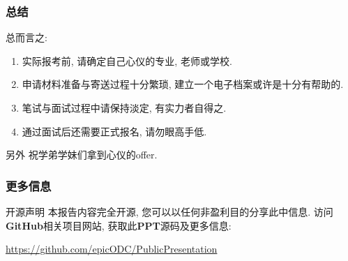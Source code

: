 \documentclass[Blue,dvipsnames]{beamer}
\begin{document}
    \begin{frame}
      \frametitle{总结}
      总而言之:
        \begin{enumerate}[label=--]
          \item 实际报考前, 请确定自己心仪的专业, 老师或学校.
          \item 申请材料准备与寄送过程十分繁琐, 建立一个电子档案或许是十分有帮助的.
          \item 笔试与面试过程中请保持淡定, 有实力者自得之.
          \item 通过面试后还需要正式报名, 请勿眼高手低.
        \end{enumerate}
        {
          \begin{block}{\small{另外}}
            祝学弟学妹们拿到心仪的offer.
          \end{block}
          }

      \end{frame}

    \begin{frame}
      \frametitle{更多信息}
      \begin{block}{开源声明}
        本报告内容完全开源, 您可以以任何非盈利目的分享此中信息. 访问\textbf{GitHub}相关项目网站, 获取此\textbf{PPT}源码及更多信息:
        
        \Large\url{https://github.com/epicODC/PublicPresentation}
      \end{block}

    \end{frame}
  
\end{document}
